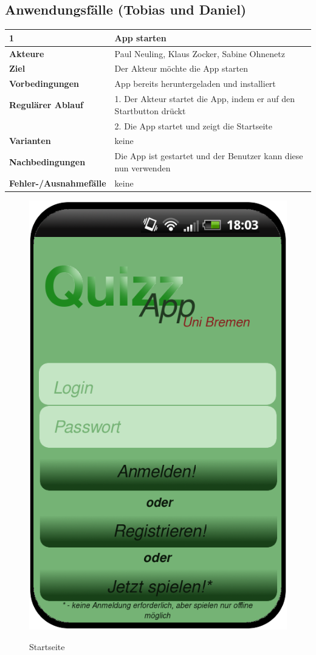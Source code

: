 \documentclass[fontsize=12pt,paper=a4,twoside]{scrartcl}
\begin{document}
\subsection{Anwendungsfälle (Tobias und Daniel)}

\begin{table}
	[H] \label{1} 
	\begin{tabular}
		{|l|p{10cm}|} \hline \textbf{1} & \textbf{App starten} \\
		\hline \textbf{Akteure} & Paul Neuling, Klaus Zocker, Sabine Ohnenetz\\
		\hline \textbf{Ziel} & Der Akteur möchte die App starten \\
		\hline \textbf{Vorbedingungen} & App bereits heruntergeladen und installiert \\
		\hline \textbf{Regulärer Ablauf} & 1. Der Akteur startet die App, indem er auf den Startbutton drückt \\
		&2. Die App startet und zeigt die Startseite \\
		\hline \textbf{Varianten} & keine \\
		\hline \textbf{Nachbedingungen} & Die App ist gestartet und der Benutzer kann diese nun verwenden\\
		\hline \textbf{Fehler-/Ausnahmefälle} & keine \\
		\hline 
	\end{tabular}
\end{table}

\begin{figure}
	[H] \caption{Startseite} 
	\includegraphics[width=0.5
	\textwidth]{Bilder/QuizzLoginRegister.png} \label{pic:Startseite} 
\end{figure}
\end{document}
